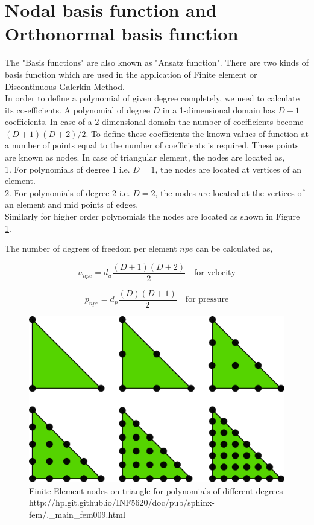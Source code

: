 \documentclass[a4paper,12pt]{book}
\begin{document}
\section[Basis function]{Nodal basis function and Orthonormal basis function}

The "Basis functions" are also known as "Ansatz function". There are two kinds of basis function which are used in the application of Finite element or Discontinuous Galerkin Method. \\
In order to define a polynomial of given degree completely, we need to calculate its co-efficients. A polynomial of degree $D$ in a 1-dimensional domain has $D+1$ coefficients. In case of a 2-dimensional domain the number of coefficients become $(D+1)(D+2)/2$. To define these coefficients the known values of function at a number of points equal to the number of coefficients is required. These points are known as nodes. In case of triangular element, the nodes are located as,\\
1. For polynomials of degree 1 i.e. $D=1$, the nodes are located at vertices of an element.\\
2. For polynomials of degree 2 i.e. $D=2$, the nodes are located at the vertices of an element and mid points of edges.\\
Similarly for higher order polynomials the nodes are located as shown in Figure \ref{fig:Nodes on Triangular Element}. 

The number of degrees of freedom per element $npe$ can be calculated as,

\begin{equation} \label{unpe}
u_{npe} = d_u \frac{(D+1)(D+2)}{2} \quad \textrm{for velocity}
\end{equation} 

\begin{equation} \label{pnpe}
p_{npe} = d_p \frac{(D)(D+1)}{2} \quad \textrm{for pressure}
\end{equation} 

\begin{figure} [H]
  \includegraphics[width=\linewidth]{fem_triangle_2.png}
  \caption{Finite Element nodes on triangle for polynomials of different degrees \\ http://hplgit.github.io/INF5620/doc/pub/sphinx-fem/.\_main\_fem009.html}
  \label{fig:Nodes on Triangular Element}
\end{figure}
\end{document}
